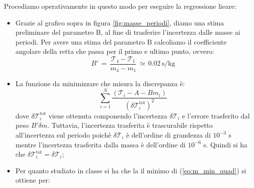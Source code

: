 
Procediamo operativamente in questo modo per eseguire la regressione lieare:

\begin{itemize}
	\item{Grazie al grafico sopra in figura \ref{fig:masse_periodi}, diamo una stima preliminare del parametro B, al fine di trasferire
        l'incertezza dalle masse ai periodi. Per avere una stima del parametro B calcoliamo il coefficiente angolare della retta che
        passa per il primo e ultimo punto, ovvero:
			\begin{equation*}
				B' \,=\, \frac{\mathcal{T}_4 - \mathcal{T}_1}{m_4 - m_1} \,\simeq\, \SI{0.02}{\second\per\kilo\gram}
			\end{equation*}
			}
	\item{La funzione da minimizzare che misura la discrepanza è:
			\begin{equation}
                \sum_{i=1}^{N} \frac{(\mathcal{T}_i - A - B m_i)}{(\delta \mathcal{T}_i^\text{tot})^2}	
                \label{eq:m_min_quad}
			\end{equation}
            dove $\delta \mathcal{T}_i^\text{tot}$ viene ottenuta componendo
            l'incertezza $\delta \mathcal{T}_i$ e l'errore trasferito dal peso $B'\delta m$. Tuttavia, l'incertezza
            trasferita è trascurabile rispetto all'incertezza sul periodo poichè $\delta \mathcal{T}_i$ è dell'ordine di
            grandezza di $10^{-3}$ s mentre l'incertezza trasferita dalla massa è dell'ordine di $10^{-6}$ s.
            Quindi si ha che $\delta \mathcal{T}_i^\text{tot} = \delta \mathcal{T}_i$;}
	\item{Per quanto studiato in classe si ha che la il minimo di (\ref{eq:m_min_quad}) si ottiene per:

}
\end{itemize}
